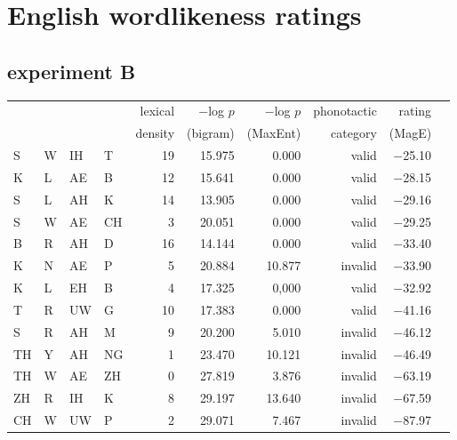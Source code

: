 \chapter{English wordlikeness ratings} \label{appendixA}

\section{\citet{Greenberg1964} experiment B}  

\begin{longtable}{l@{ } l@{ } l@{ } l r r r r r r}
\toprule
   &   &    &    & lexical & $-$log $p$ & $-$log $p$ & phonotactic & rating \\
   &   &    &    & density & (bigram)   & (MaxEnt)   & category    & (MagE) \\
\midrule
S  & W & IH & T  & 19      & 15.975     & 0.000      & valid       & $-$25.10 \\
K  & L & AE & B  & 12      & 15.641     & 0.000      & valid       & $-$28.15 \\
S  & L & AH & K  & 14      & 13.905     & 0.000      & valid       & $-$29.16 \\
S  & W & AE & CH &  3      & 20.051     & 0.000      & valid       & $-$29.25 \\
B  & R & AH & D  & 16      & 14.144     & 0.000      & valid       & $-$33.40 \\
K  & N & AE & P  &  5      & 20.884     & 10.877     & invalid     & $-$33.90 \\
K  & L & EH & B  &  4      & 17.325     & 0,000      & valid       & $-$32.92 \\
T  & R & UW & G  & 10      & 17.383     & 0.000      & valid       & $-$41.16 \\
S  & R & AH & M  &  9      & 20.200     & 5.010      & invalid     & $-$46.12 \\
TH & Y & AH & NG &  1      & 23.470     & 10.121     & invalid     & $-$46.49 \\
TH & W & AE & ZH &  0      & 27.819     & 3.876      & invalid     & $-$63.19 \\
ZH & R & IH & K  &  8      & 29.197     & 13.640     & invalid     & $-$67.59 \\
CH & W & UW & P  &  2      & 29.071     & 7.467      & invalid     & $-$87.97 \\
\bottomrule
\end{longtable}

